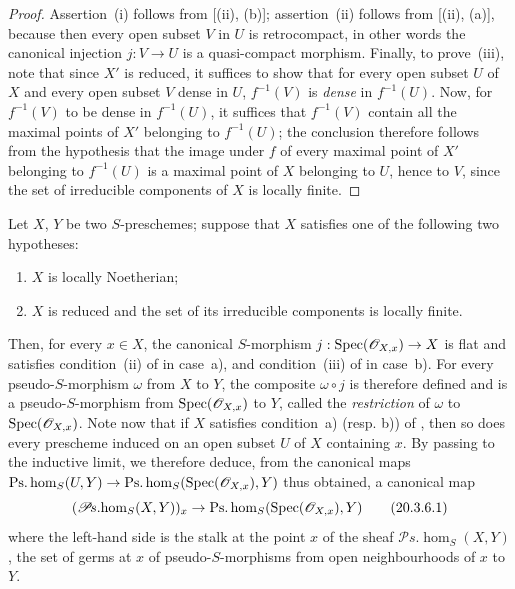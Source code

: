 \begin{proof}
Assertion~(i) follows from [(ii), (b)]; assertion~(ii) follows from [(ii), (a)], because then every open subset $V$ in $U$ is retrocompact, in other words the canonical injection $j:V\to U$ is a quasi-compact morphism.
Finally, to prove~(iii), note that since $X'$ is reduced, it suffices to show that for every open subset $U$ of $X$ and every open subset $V$ dense in $U$, $f^{-1}(V)$ is \emph{dense} in $f^{-1}(U)$.
Now, for $f^{-1}(V)$ to be dense in $f^{-1}(U)$, it suffices that $f^{-1}(V)$ contain all the maximal points of $X'$ belonging to $f^{-1}(U)$; the conclusion therefore follows from the hypothesis that the image under $f$ of every
maximal point of $X'$ belonging to $f^{-1}(U)$ is a maximal point of $X$ belonging to $U$, hence to $V$, since the set of irreducible components of $X$ is locally finite.
\end{proof}

\begin{env}[20.3.6]\label{IV.20.3.6}
Let $X$, $Y$ be two $S$-preschemes; suppose that $X$ satisfies one of the following two hypotheses:
\begin{enumerate}[label=\emph{\alph*)}]
  \item $X$ is locally Noetherian;
  \item $X$ is reduced and the set of its irreducible components is locally finite.
\end{enumerate}
Then, for every $x\in X$, the canonical $S$-morphism $j:\operatorname{Spec}(\mathscr{O}_{X,x})\to X$ is flat and satisfies condition~(ii) of  in case~a), and condition~(iii) of  in case~b).
For every pseudo-$S$-morphism $\omega$ from $X$ to $Y$, the composite $\omega\circ j$ is therefore defined and is a pseudo-$S$-morphism from $\operatorname{Spec}(\mathscr{O}_{X,x})$ to $Y$, called the \emph{restriction} of $\omega$ to $\operatorname{Spec}(\mathscr{O}_{X,x})$.
Note now that if $X$ satisfies condition~a) (resp. b)) of , then so does every prescheme induced on an open subset $U$ of $X$ containing $x$.
By passing to the inductive limit, we therefore deduce, from the canonical maps $\operatorname{Ps.hom}_S(U,Y)\to\operatorname{Ps.hom}_S(\operatorname{Spec}(\mathscr{O}_{X,x}),Y)$ thus obtained, a canonical map
\[
\label{IV.20.3.6.1}
  (\mathscr{P}\!s.\!\operatorname{hom}_S(X,Y))_x\to\operatorname{Ps.hom}_S(\operatorname{Spec}(\mathscr{O}_{X,x}),Y)
  \tag{20.3.6.1}
\]
where the left-hand side is the stalk at the point $x$ of the sheaf $\mathscr{P}\!s.\!\operatorname{hom}_S(X,Y)$, the set of germs at $x$ of pseudo-$S$-morphisms from open neighbourhoods of $x$ to $Y$.
\end{env}

